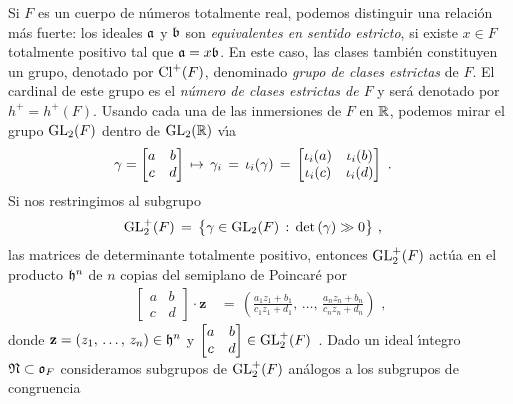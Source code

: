Si $F$ es un cuerpo de n\'{u}meros totalmente real, podemos distinguir una
relaci\'{o}n m\'{a}s fuerte: los ideales $\frak{a}$ y $\frak{b}$ son
\emph{equivalentes en sentido estricto}, si existe $x\in F$ totalmente positivo
tal que $\frak{a}=x\frak{b}$. En este caso, las clases tambi\'{e}n constituyen
un grupo, denotado por $\pClass{F}$, denominado \emph{grupo de clases %
estrictas} de $F$. El cardinal de este grupo es el \emph{n\'{u}mero de clases %
estrictas de $F$} y ser\'{a} denotado por $h^{+}=h^{+}(F)$. Usando cada una de
las inmersiones de $F$ en $\bb{R}$, podemos mirar el grupo $\GL_{2}(F)$ dentro
de $\GL_{2}(\bb{R})$ v\'{\i}a
\begin{align*}
	& \gamma=\left[\begin{matrix} a & b \\ c & d \end{matrix}\right]
		\,\mapsto\,\gamma_{i} \,=\,\inc[i](\gamma)\,=\,
		\left[\begin{matrix} \inc[i](a) & \inc[i](b) \\
		\inc[i](c) & \inc[i](d) \end{matrix}\right]
	\text{ .}
\end{align*}
%
Si nos restringimos al subgrupo
\begin{align*}
	\GLtp_{2}(F) & \,=\,\big\lbrace\gamma\in\GL_{2}(F)\,:\,
		\det(\gamma)\gg 0\big\rbrace
	\text{ ,}
\end{align*}
%
las matrices de determinante totalmente positivo, entonces $\GLtp_{2}(F)$
act\'{u}a en el producto $\hP^{n}$ de $n$ copias del semiplano de Poincar\'{e}
por
\begin{align*}
	\left[\begin{matrix} a & b \\ c & d \end{matrix}\right]\cdot\mathbf{z}
		& \,=\,
	\left(\frac{a_{1}z_{1}+b_{1}}{c_{1}z_{1}+d_{1}},\,\dots,\,
	\frac{a_{n}z_{n}+b_{n}}{c_{n}z_{n}+d_{n}}\right)
	\text{ ,}
\end{align*}
%
donde $\mathbf{z}=(\lista{z}{n})\in\hP^{n}$ y
\begin{math}
	\left[\begin{matrix} a & b \\ c & d \end{matrix}\right]
		\in\GLtp_{2}(F)
\end{math}~.
Dado un ideal \'{\i}ntegro $\frak{N}\subset\oka{F}$ consideramos subgrupos
de $\GLtp_{2}(F)$ an\'{a}logos a los subgrupos de congruencia
